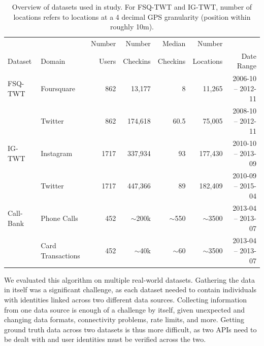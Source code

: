 


\begin{table}
  \centering
  \begin{tabular}{llrrrrr}
            &        & Number & Number  &   Median  &  Number   &           \\
    Dataset & Domain & Users & Checkins &  Checkins & Locations & Date Range\\
    \midrule
    FSQ-TWT   & Foursquare  & 862 & 13,177  & 8    & 11,265 & 2006-10 -- 2012-11 \\
              & Twitter     & 862 & 174,618 & 60.5 & 75,005 & 2008-10 -- 2012-11 \\
    \addlinespace
    IG-TWT    & Instagram   & 1717 & 337,934 & 93 & 177,430 & 2010-10 -- 2013-09 \\
              & Twitter     & 1717 & 447,366 & 89 & 182,409 & 2010-09 -- 2015-04 \\
    \addlinespace
    Call-Bank & Phone Calls       & 452 & $\sim$200k & $\sim$550 & $\sim$3500 & 2013-04 -- 2013-07 \\
              & Card Transactions & 452 & $\sim$40k & $\sim$60 & $\sim$3500 & 2013-04 -- 2013-07 \\
  \end{tabular}
  \caption{Overview of datasets used in study. For FSQ-TWT and IG-TWT, number of locations refers to locations at a 4 decimal GPS granularity (position within roughly 10m).}
  \label{tab:link-data}
\end{table}

We evaluated this algorithm on multiple real-world datasets.
Gathering the data in itself was a significant challenge, as each dataset needed to contain individuals with identities linked across two different data sources.
Collecting information from one data source is enough of a challenge by itself, given unexpected and changing data formats, connectivity problems, rate limits, and more.
Getting ground truth data across two datasets is thus more difficult, as two APIs need to be dealt with and user identities must be verified across the two.

